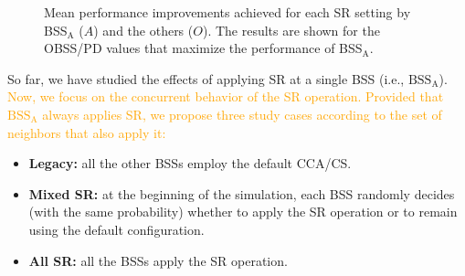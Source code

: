 \documentclass{ieeeaccess}
\begin{document}
\begin{figure}[ht!]
	\centering		
	\caption{Mean performance improvements achieved for each SR setting by BSS$_\text{A}$ ($A$) and the others ($O$). The results are shown for the OBSS/PD values that maximize the performance of BSS$_\text{A}$.}\label{fig:SIM_2_3}
\end{figure}

So far, we have studied the effects of applying SR at a single BSS (i.e., $\text{BSS}_\text{A}$). \textcolor{orange}{Now, we focus on the concurrent behavior of the SR operation. Provided that $\text{BSS}_\text{A}$ always applies SR, we propose three study cases according to the set of neighbors that also apply it: }
\begin{itemize}
	\item \textbf{Legacy:} all the other BSSs employ the default CCA/CS.
	\item \textbf{Mixed SR:} at the beginning of the simulation, each BSS randomly decides (with the same probability) whether to apply the SR operation or to remain using the default configuration.
	\item \textbf{All SR:} all the BSSs apply the SR operation. 
\end{itemize}
\end{document}
